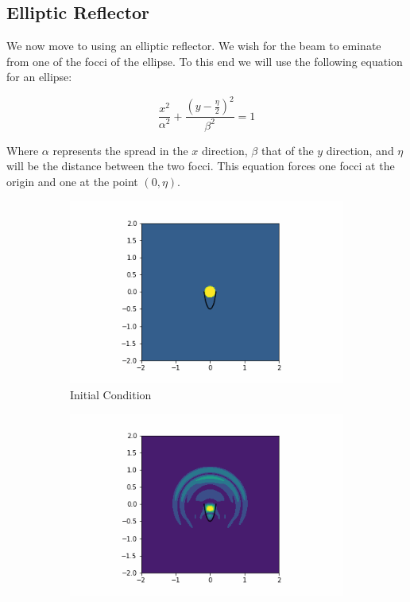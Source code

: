 \documentclass{article}
\begin{document}
\subsection{Elliptic Reflector}

We now move to using an elliptic reflector.  We wish for the beam to eminate
from one of the focci of the ellipse.  To this end we will use the following
equation for an ellipse:

$$\frac{x^2}{\alpha^2} + \frac{\left(y - \frac{\eta}{2}\right)^2}{\beta^2} = 1$$

Where $\alpha$ represents the spread in the $x$ direction, $\beta$ that of
the $y$ direction, and $\eta$ will be the distance between the two focci.
This equation forces one focci at the origin and one at the point $(0,\eta)$.

\begin{figure}[h]
  \begin{subfigure}[b]{0.45\textwidth}
    \includegraphics[width=\textwidth]{figures/elliptic-dish-0}
    \caption{Initial Condition}
    \label{fig:ellip-init}
  \end{subfigure}
  \begin{subfigure}[b]{0.45\textwidth}
    \includegraphics[width=\textwidth]{figures/elliptic-dish-100}

\end{subfigure}
\end{figure}
\end{document}
